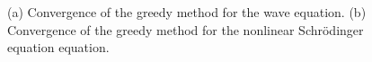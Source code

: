\begin{figure}

\begin{minipage}{.5\linewidth}
\centering
{}
\end{minipage}%
\begin{minipage}{.5\linewidth}
\centering
{}
\end{minipage}\par\medskip
\centering

\caption{ (a) Convergence of the greedy method for the wave equation. (b) Convergence of the greedy method for the nonlinear Schr\"odinger equation equation. }
\label{fig:NuRe:5}
\end{figure}
